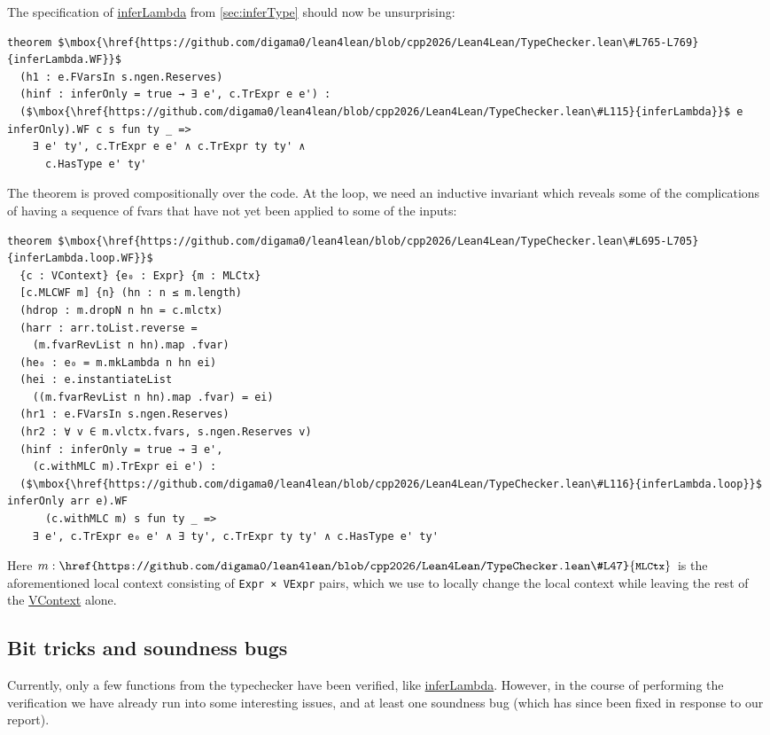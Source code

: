\documentclass[sigplan,10pt,screen]{acmart}\settopmatter{printfolios=true,printccs=false,printacmref=false}
\newcommand{\code}[1]{\mbox{\ttfamily\small #1}}
\begin{document}
The specification of \href{https://github.com/digama0/lean4lean/blob/cpp2026/Lean4Lean/TypeChecker.lean#L115}{\code{inferLambda}} from \autoref{sec:inferType} should now be unsurprising:
\begin{lstlisting}
theorem $\mbox{\href{https://github.com/digama0/lean4lean/blob/cpp2026/Lean4Lean/TypeChecker.lean\#L765-L769}{inferLambda.WF}}$
  (h1 : e.FVarsIn s.ngen.Reserves)
  (hinf : inferOnly = true → ∃ e', c.TrExpr e e') :
  ($\mbox{\href{https://github.com/digama0/lean4lean/blob/cpp2026/Lean4Lean/TypeChecker.lean\#L115}{inferLambda}}$ e inferOnly).WF c s fun ty _ =>
    ∃ e' ty', c.TrExpr e e' ∧ c.TrExpr ty ty' ∧
      c.HasType e' ty'
\end{lstlisting}
The theorem is proved compositionally over the code. At the loop, we need an inductive invariant which reveals some of the complications of having a sequence of fvars that have not yet been applied to some of the inputs:
\begin{lstlisting}
theorem $\mbox{\href{https://github.com/digama0/lean4lean/blob/cpp2026/Lean4Lean/TypeChecker.lean\#L695-L705}{inferLambda.loop.WF}}$
  {c : VContext} {e₀ : Expr} {m : MLCtx}
  [c.MLCWF m] {n} (hn : n ≤ m.length)
  (hdrop : m.dropN n hn = c.mlctx)
  (harr : arr.toList.reverse =
    (m.fvarRevList n hn).map .fvar)
  (he₀ : e₀ = m.mkLambda n hn ei)
  (hei : e.instantiateList
    ((m.fvarRevList n hn).map .fvar) = ei)
  (hr1 : e.FVarsIn s.ngen.Reserves)
  (hr2 : ∀ v ∈ m.vlctx.fvars, s.ngen.Reserves v)
  (hinf : inferOnly = true → ∃ e',
    (c.withMLC m).TrExpr ei e') :
  ($\mbox{\href{https://github.com/digama0/lean4lean/blob/cpp2026/Lean4Lean/TypeChecker.lean\#L116}{inferLambda.loop}}$ inferOnly arr e).WF
      (c.withMLC m) s fun ty _ =>
    ∃ e', c.TrExpr e₀ e' ∧ ∃ ty', c.TrExpr ty ty' ∧ c.HasType e' ty'
\end{lstlisting}
Here $m:\mbox{\href{https://github.com/digama0/lean4lean/blob/cpp2026/Lean4Lean/TypeChecker.lean\#L47}{\code{MLCtx}}}$ is the aforementioned local context consisting of \lstinline|Expr × VExpr| pairs, which we use to locally change the local context while leaving the rest of the \href{https://github.com/digama0/lean4lean/blob/cpp2026/Lean4Lean/Verify/TypeChecker/Theorems.lean#L111}{\code{VContext}} alone.

\subsection{Bit tricks and soundness bugs}
Currently, only a few functions from the typechecker have been verified, like \href{https://github.com/digama0/lean4lean/blob/cpp2026/Lean4Lean/TypeChecker.lean#L115}{\code{inferLambda}}. However, in the course of performing the verification we have already run into some interesting issues, and at least one soundness bug (which has since been fixed in response to our report).
\end{document}
